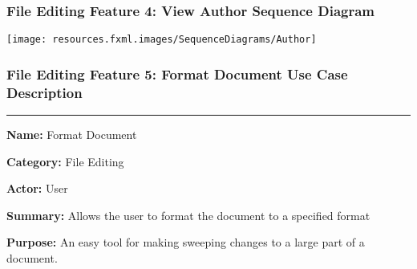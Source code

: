 \documentclass[twoside,letterpaper]{article}
\begin{document}
\subsubsection[File Editing Feature 4: View Author Sequence Diagram]{\rmfamily\bfseries\color{black}
	File Editing Feature 4: View Author Sequence Diagram}
\hypertarget{RefHeading22059017292}{}

\bigskip

\texttt{[image: resources.fxml.images/SequenceDiagrams/Author]}

\newpage

\subsubsection[File Editing Feature 5: Format Document]{\rmfamily\bfseries\color{black}
	File Editing Feature 5: Format Document Use Case Description}
\hypertarget{RefHeading22059017292}{}

\vspace{2pt}
\hrule
\vspace{8pt}
	\noindent\textbf{Name:} Format Document \newline
	
	\noindent\textbf{Category:} File Editing \newline
	
	\noindent\textbf{Actor:} User \newline
	
	\noindent\textbf{Summary:} Allows the user to format the document to a specified format \newline
	
	\noindent\textbf{Purpose:} An easy tool for making sweeping changes to a large part of a document. \newline
	
\end{document}
